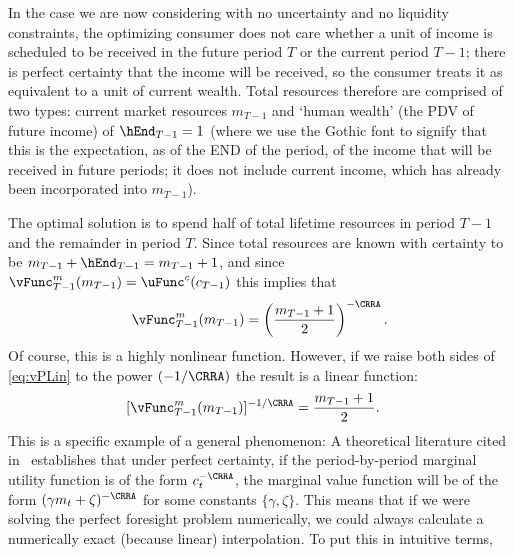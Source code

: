 \documentclass[titlepage, headings=optiontotocandhead]{\econtex}
\begin{document}
In the case we are now considering with no uncertainty and no liquidity
constraints, the optimizing consumer does not care whether a unit of
income is scheduled to be received in the future period $T$ or the
current period $T-1$; there is perfect certainty that the income will
be received, so the consumer treats it as equivalent to a unit of
current wealth.  Total resources therefore are comprised of two types:
current market resources ${m}_{T-1}$ and `human wealth' (the PDV of
future income) of $\hEnd_{T-1}=1$ (where we use the Gothic font to
signify that this is the expectation, as of the END of the period, of
the income that will be received in future periods; it does not
include current income, which has already been incorporated into
${m}_{T-1}$).

The optimal solution is to spend half of total lifetime resources in
period $T-1$ and the remainder in period $T$.  Since total resources
are known with certainty to be
${m}_{T-1}+\hEnd_{T-1}= {m}_{T-1}+1$, and since
${\vFunc}_{T-1}^{{m}}({m}_{T-1}) = \uFunc^{{c}}({c}_{T-1})$ this
implies that 
\begin{equation}
  \vFunc^{{m}}_{T-1}({m}_{T-1})  = \left(\frac{{m}_{T-1}+1}{2}\right)^{-\CRRA} \label{eq:vPLin}.
\end{equation}
Of course, this is a highly nonlinear
function.  However, if we raise both sides of \eqref{eq:vPLin} to the
power $(-1/\CRRA)$ the result is a linear function:
\begin{equation}\begin{gathered}\begin{aligned}
      [\vFunc^{{m}}_{T-1}({m}_{T-1})]^{-1/\CRRA}  & = \frac{{m}_{T-1}+1}{2}  .
    \end{aligned}\end{gathered}\end{equation}
This is a specific example of a general phenomenon: A theoretical
literature cited in~\cite{ckConcavity} establishes that under
perfect certainty, if the period-by-period marginal utility function
is of the form ${c}_{t}^{-\CRRA}$, the marginal value function will be
of the form $(\gamma {m}_{t}+\zeta)^{-\CRRA}$ for some constants
$\{\gamma,\zeta\}$.  This means that if we were solving the perfect
foresight problem numerically, we could always calculate a numerically
exact (because linear) interpolation.  To put this in intuitive terms,
\end{document}
